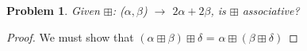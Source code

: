 \documentclass[11pt,a4paper,english]{article}
\newtheorem{prob}{Problem}
\begin{document}
\begin{prob}
   Given $\boxplus$: ($\alpha, \beta$) $\to$ $2\alpha + 2\beta$, is $\boxplus$ associative? 
\end{prob}
\begin{proof}
    We must show that $(\alpha \boxplus \beta) \boxplus \delta$ = $\alpha \boxplus (\beta \boxplus \delta)$
\end{proof}
\end{document}

